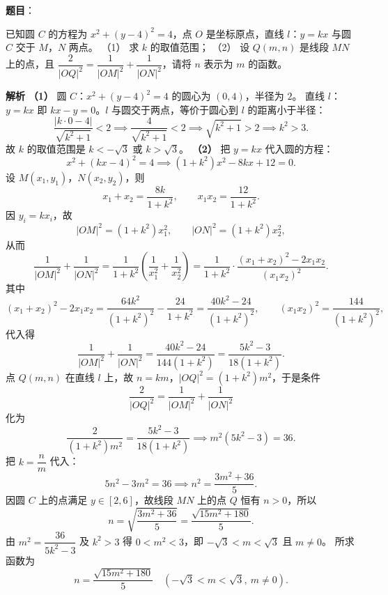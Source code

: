 \begin{answer}

\textbf{题目}：

已知圆 $C$ 的方程为 $x^2+(y-4)^2=4$，点 $O$ 是坐标原点，直线 $l$：$y=kx$ 与圆 $C$ 交于 $M$，$N$ 两点。
（1） 求 $k$ 的取值范围；
（2） 设 $Q(m,n)$ 是线段 $MN$ 上的点，且 $\dfrac2{|OQ|^2}=\dfrac1{|OM|^2}+\dfrac1{|ON|^2}$，请将 $n$ 表示为 $m$ 的函数。

\textbf{解析}
\textbf{（1）} 圆 $C$：$x^2+(y-4)^2=4$ 的圆心为 $(0,4)$，半径为 $2$。
直线 $l$：$y=kx$ 即 $kx-y=0$。$l$ 与圆交于两点，等价于圆心到 $l$ 的距离小于半径：
\nopagebreak[4]
\[\frac{|k\cdot0-4|}{\sqrt{k^2+1}}<2\implies\frac4{\sqrt{k^2+1}}<2\implies\sqrt{k^2+1}>2\implies k^2>3.\]
故 $k$ 的取值范围是 $k<-\sqrt3$ 或 $k>\sqrt3$。
\textbf{（2）} 把 $y=kx$ 代入圆的方程：
\nopagebreak[4]
\[x^2+(kx-4)^2=4\implies\left(1+k^2\right)x^2-8kx+12=0.\]
设 $M(x_1,y_1)$，$N(x_2,y_2)$，则
\nopagebreak[4]
\[x_1+x_2=\frac{8k}{1+k^2},\qquad x_1x_2=\frac{12}{1+k^2}.\]
因 $y_i=kx_i$，故
\nopagebreak[4]
\[|OM|^2=\left(1+k^2\right)x_1^2,\qquad|ON|^2=\left(1+k^2\right)x_2^2,\]
从而
\nopagebreak[4]
\[\frac1{|OM|^2}+\frac1{|ON|^2}=\frac1{1+k^2}\left(\frac1{x_1^2}+\frac1{x_2^2}\right)=\frac1{1+k^2}\cdot\frac{(x_1+x_2)^2-2x_1x_2}{(x_1x_2)^2}.\]
其中
\nopagebreak[4]
\[(x_1+x_2)^2-2x_1x_2=\frac{64k^2}{(1+k^2)^2}-\frac{24}{1+k^2}=\frac{40k^2-24}{(1+k^2)^2},\qquad(x_1x_2)^2=\frac{144}{(1+k^2)^2},\]
代入得
\nopagebreak[4]
\[\frac1{|OM|^2}+\frac1{|ON|^2}=\frac{40k^2-24}{144(1+k^2)}=\frac{5k^2-3}{18(1+k^2)}.\]
点 $Q(m,n)$ 在直线 $l$ 上，故 $n=km$，$|OQ|^2=(1+k^2)m^2$，于是条件
\nopagebreak[4]
\[\frac2{|OQ|^2}=\frac1{|OM|^2}+\frac1{|ON|^2}\]
化为
\nopagebreak[4]
\[\frac2{(1+k^2)m^2}=\frac{5k^2-3}{18(1+k^2)}\implies m^2\left(5k^2-3\right)=36.\]
把 $k=\dfrac nm$ 代入：
\nopagebreak[4]
\[5n^2-3m^2=36\implies n^2=\frac{3m^2+36}5.\]
因圆 $C$ 上的点满足 $y\in[2,6]$，故线段 $MN$ 上的点 $Q$ 恒有 $n>0$，所以
\nopagebreak[4]
\[n=\sqrt{\frac{3m^2+36}5}=\frac{\sqrt{15m^2+180}}5.\]
由 $m^2=\dfrac{36}{5k^2-3}$ 及 $k^2>3$ 得 $0<m^2<3$，即 $-\sqrt3<m<\sqrt3$ 且 $m\neq0$。
所求函数为
\nopagebreak[4]
\[n=\frac{\sqrt{15m^2+180}}5\quad\left(-\sqrt3<m<\sqrt3,\ m\neq0\right).\]



\end{answer}
